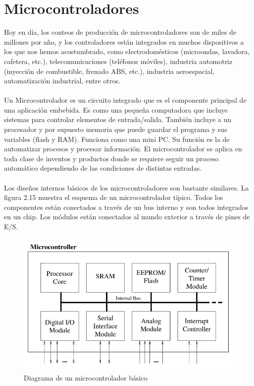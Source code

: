 \section{Microcontroladores}
Hoy en día, los conteos de producción de microcontroladores son de miles de millones por año, y los controladores están integrados en muchos dispositivos a los que nos hemos acostumbrado, como electrodomésticos (microondas, lavadora, cafetera, etc.), telecomunicaciones (teléfonos móviles), industria automotriz (inyección de combustible, frenado ABS, etc.), industria aeroespacial, automatización industrial, entre otros.
\paragraph{}
Un Microcontrolador es un circuito integrado que es el componente principal de una aplicación embebida. Es como una pequeña computadora que incluye sistemas para controlar elementos de entrada/salida. También incluye a un procesador y por supuesto memoria que puede guardar el programa y sus variables (flash y RAM).  Funciona como una mini PC. Su función es la de automatizar procesos y procesar información.
El microcontrolador se aplica en toda clase de inventos y productos donde se requiere seguir un proceso automático dependiendo de las condiciones de distintas entradas.
\paragraph{}
Los diseños internos básicos de los microcontroladores son bastante similares. La figura 2.15 muestra el esquema de un microcontrolador típico. Todos los componentes están conectados a través de un bus interno y son todos integrados en un chip. Los módulos están conectados al mundo exterior a través de pines de E/S.
\paragraph{}
\begin{figure}[H]
	\centering
	\includegraphics[scale=.5]{Capitulo2/images/microcontrolador.png}
	\caption{Diagrama de un microcontrolador básico}
	\label{fig:diagrama_dispMonitoreo}
\end{figure}

